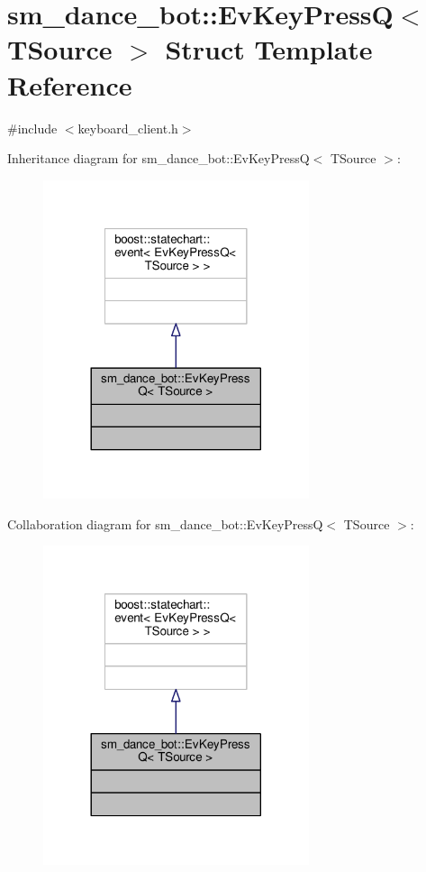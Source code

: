 \hypertarget{structsm__dance__bot_1_1EvKeyPressQ}{}\section{sm\+\_\+dance\+\_\+bot\+:\+:Ev\+Key\+PressQ$<$ T\+Source $>$ Struct Template Reference}
\label{structsm__dance__bot_1_1EvKeyPressQ}


{\ttfamily \#include $<$keyboard\+\_\+client.\+h$>$}



Inheritance diagram for sm\+\_\+dance\+\_\+bot\+:\+:Ev\+Key\+PressQ$<$ T\+Source $>$\+:
\nopagebreak
\begin{figure}[H]
\begin{center}
\leavevmode
\includegraphics[width=221pt]{structsm__dance__bot_1_1EvKeyPressQ__inherit__graph}
\end{center}
\end{figure}


Collaboration diagram for sm\+\_\+dance\+\_\+bot\+:\+:Ev\+Key\+PressQ$<$ T\+Source $>$\+:
\nopagebreak
\begin{figure}[H]
\begin{center}
\leavevmode
\includegraphics[width=221pt]{structsm__dance__bot_1_1EvKeyPressQ__coll__graph}
\end{center}
\end{figure}


